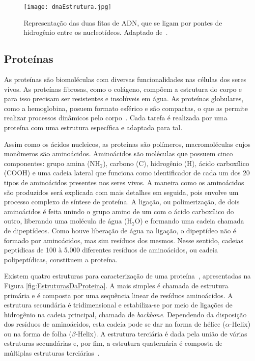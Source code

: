 \begin{figure}[h]
    \centering
    \texttt{[image: dnaEstrutura.jpg]}
    \caption{Representação das duas fitas de ADN, que se ligam por pontes de hidrogênio entre os nucleotídeos. Adaptado de~\cite{dnadiscovery08}.}
    \label{fig:EstruturasDoDNA}
\end{figure} 



\subsection{Proteínas} \label{proteinas}

\indent As proteínas são biomoléculas com diversas funcionalidades nas células dos seres vivos. As proteínas fibrosas, como o colágeno, compõem a estrutura do corpo e para isso precisam ser resistentes e insolúveis em água. As proteínas globulares, como a hemoglobina, posuem formato esférico e são compactas, o que as permite realizar processos dinâmicos pelo corpo~\cite{LauraProteinas07}. Cada tarefa é realizada por uma proteína com uma estrutura específica e adaptada para tal.

\indent Assim como os ácidos nucleicos, as proteínas são polímeros, macromoléculas cujos monômeros são aminoácidos. Aminoácidos são moléculas que possuem cinco componentes: grupo amina (NH$_{2}$), carbono (C), hidrogênio (H), ácido carboxílico (COOH) e uma cadeia lateral que funciona como identificador de cada um dos 20 tipos de aminoácidos presentes nos seres vivos. A maneira como os aminoácidos são produzidos será explicada com mais detalhes em seguida, pois envolve um processo complexo de síntese de proteína. A ligação, ou polimerização, de dois aminoácidos é feita unindo o grupo amino de um com o ácido carboxílico do outro, liberando uma molécula de água (H$_{2}$O) e formando uma cadeia chamada de dipeptídeos. Como houve liberação de água na ligação, o dipeptídeo não é formado por aminoácidos, mas sim resíduos dos mesmos. Nesse sentido, cadeias peptídicas de 100 à 5.000 diferentes resíduos de aminoácidos, ou cadeia polipeptídicas, constituem a proteína.

\indent Existem quatro estruturas para caracterização de uma proteína~\cite{setubal97}, apresentadas na Figura \ref{fig:EstruturasDaProteina}. A mais simples é chamada de estrutura primária e é composta por uma sequência linear de resíduos aminoácidos. A estrutura secundária é tridimensional e estabiliza-se por meio de ligações de hidrogênio na cadeia principal, chamada de \textit{backbone}. Dependendo da disposição dos resíduos de aminoácidos, esta cadeia pode se dar na forma de hélice ($\alpha$-Helix) ou na forma de folha ($\beta$-Helix). A estrutura terciária é dada pela união de várias estruturas secundárias e, por fim, a estrutura quaternária é composta de múltiplas estruturas terciárias~\cite{drug09}.

